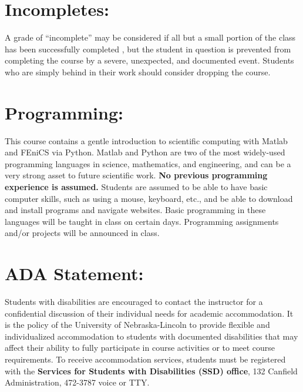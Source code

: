 \documentclass[margin]{res}
\theoremstyle{plain}
\theoremstyle{definition}
\theoremstyle{remark}
\begin{document}
\begin{resume}
\section{Incompletes:}
A grade of ``incomplete'' may be considered if all but a small portion of the class has been successfully completed , but the student in question is prevented from completing the course by a severe, unexpected, and documented event. Students who are simply behind in their work should consider dropping the course.

\pagebreak

\section{Programming:}   This course contains a gentle introduction to scientific computing with Matlab and FEniCS via Python.  Matlab and Python are two of the most widely-used programming languages in science, mathematics, and engineering, and can be a very strong asset to future scientific work.  \textbf{No previous programming experience is assumed.}  Students are assumed to be able to have basic computer skills, such as using a mouse, keyboard, etc., and be able to download and install programs and navigate websites.  Basic programming in these languages will be taught in class on certain days.  Programming assignments and/or projects will be announced in class.



\section{ADA  Statement:} Students with disabilities are encouraged to contact the instructor for a confidential discussion of their individual needs for academic accommodation. It is the policy of the University of Nebraska-Lincoln to provide flexible and individualized accommodation to students with documented disabilities that may affect their ability to fully participate in course activities or to meet course requirements. To receive accommodation services, students must be registered with the  {\bf Services for Students with Disabilities (SSD) office}, 132 Canfield Administration, 472-3787 voice or TTY. 


\end{resume}
\end{document}
